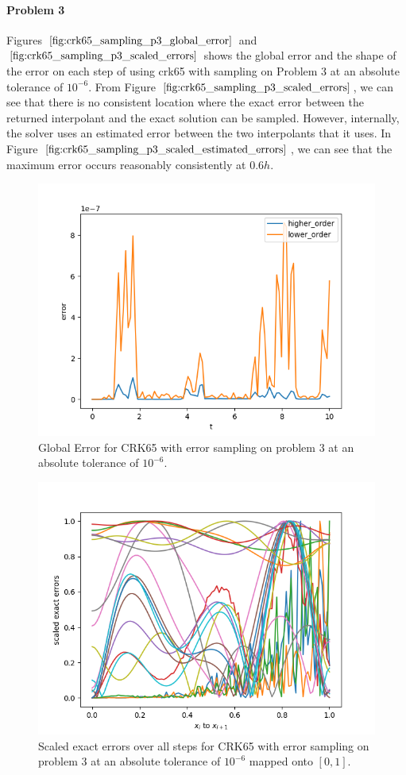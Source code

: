 \paragraph{Problem 3} Figures $\ref{fig:crk65_sampling_p3_global_error}$ and $\ref{fig:crk65_sampling_p3_scaled_errors}$ shows the global error and the shape of the error on each step of using crk65 with sampling on Problem 3 at an absolute tolerance of $10^{-6}$. From Figure $\ref{fig:crk65_sampling_p3_scaled_errors}$, we can see that there is no consistent location where the exact error between the returned interpolant and the exact solution can be sampled. However, internally, the solver uses an estimated error between the two interpolants that it uses. In Figure $\ref{fig:crk65_sampling_p3_scaled_estimated_errors}$, we can see that the maximum error occurs reasonably consistently at $0.6h$.

\begin{figure}[H]
\centering
\includegraphics[width=0.7\linewidth]{./figures/crk65_sampling_p3_global_error}
\caption{Global Error for CRK65 with error sampling on problem 3 at an absolute tolerance of $10^{-6}$.}
\label{fig:crk65_sampling_p3_global_error}
\end{figure}

\begin{figure}[H]
\centering
\includegraphics[width=0.7\linewidth]{./figures/crk65_sampling_p3_scaled_errors}
\caption{Scaled exact errors over all steps for CRK65 with error sampling on problem 3 at an absolute tolerance of $10^{-6}$ mapped onto $[0, 1]$.}
\label{fig:crk65_sampling_p3_scaled_errors}
\end{figure}

